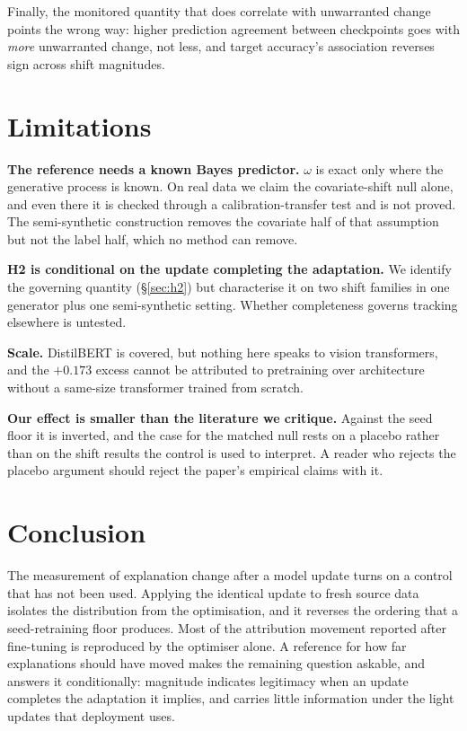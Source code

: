 \documentclass{article}
\begin{document}
Finally, the monitored quantity that does correlate with unwarranted change points the wrong way:
higher prediction agreement between checkpoints goes with \emph{more} unwarranted change, not less,
and target accuracy's association reverses sign across shift magnitudes.

\section{Limitations}

\textbf{The reference needs a known Bayes predictor.} $\omega$ is exact only where the generative
process is known. On real data we claim the covariate-shift null alone, and even there it is checked
through a calibration-transfer test and is not proved. The semi-synthetic construction removes the
covariate half of that assumption but not the label half, which no method can remove.

\textbf{H2 is conditional on the update completing the adaptation.} We identify the governing
quantity (\S\ref{sec:h2}) but characterise it on two shift families in one generator plus one
semi-synthetic setting. Whether completeness governs tracking elsewhere is untested.

\textbf{Scale.} DistilBERT is covered, but nothing here speaks to vision transformers, and the
$+0.173$ excess cannot be attributed to pretraining over architecture without a same-size
transformer trained from scratch.

\textbf{Our effect is smaller than the literature we critique.} Against the seed floor it is
inverted, and the case for the matched null rests on a placebo rather than on the shift results the
control is used to interpret. A reader who rejects the placebo argument should reject the paper's
empirical claims with it.

\section{Conclusion}

The measurement of explanation change after a model update turns on a control that has not been
used. Applying the identical update to fresh source data isolates the distribution from the
optimisation, and it reverses the ordering that a seed-retraining floor produces. Most of the
attribution movement reported after fine-tuning is reproduced by the optimiser alone. A reference for
how far explanations should have moved makes the remaining question askable, and answers it
conditionally: magnitude indicates legitimacy when an update completes the adaptation it implies, and
carries little information under the light updates that deployment uses.
\end{document}
